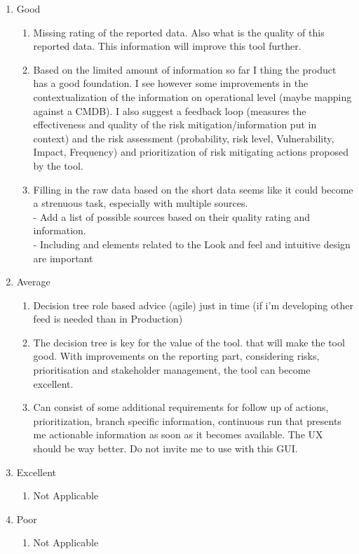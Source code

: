  \begin{enumerate}
 \item Good
 \begin{enumerate}
\item Missing rating of the reported data. Also what is the quality of this reported data. This information will improve
this tool further.
\item Based on the limited amount of information so far I thing the product has a good foundation. I see however some
improvements in the contextualization of the information on operational level (maybe mapping against a CMDB). I
also suggest a feedback loop (measures the effectiveness and quality of the risk mitigation/information put in
context) and the risk assessment (probability, risk level, Vulnerability, Impact, Frequency) and prioritization of risk
mitigating actions proposed by the tool.
\item Filling in the raw data based on the short data seems like it could become a strenuous task, especially with
multiple sources. 
\\- Add a list of possible sources based on their quality rating and information. 
\\- Including and
elements related to the Look and feel and intuitive design are important
  \end{enumerate}
   \item Average 
   \begin{enumerate}
      
  
    \item Decision tree role based advice (agile) just in time (if i'm developing other feed is needed than in Production)
 \item The decision tree is key for the value of the tool. that will make the tool good. With improvements on the
reporting part, considering risks, prioritisation and stakeholder management, the tool can become excellent.
 \item Can consist of some additional requirements for follow up of actions, prioritization, branch specific information,
continuous run that presents me actionable information as soon as it becomes available. The UX should be way better. Do not invite me to use with this GUI.
 \end{enumerate}
   \item Excellent 
   \begin{enumerate}
       \item Not Applicable 
   \end{enumerate}
   \item Poor
   \begin{enumerate}
       \item Not Applicable 
   \end{enumerate}
 \end{enumerate}



